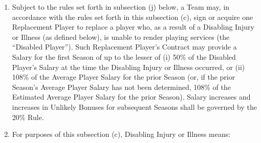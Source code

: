 \documentclass[
]{book}
\providecommand{\tightlist}{%
  \setlength{\itemsep}{0pt}\setlength{\parskip}{0pt}}
\begin{document}
\begin{enumerate}
  \begin{enumerate}
  \def\labelenumii{(\arabic{enumii})}
  \tightlist
  \item
    Subject to the rules set forth in subsection (j) below, a Team may, in accordance with the rules set forth in this subsection (c), sign or acquire one Replacement Player to replace a player who, as a result of a Disabling Injury or Illness (as defined below), is unable to render playing services (the ``Disabled Player''). Such Replacement Player's Contract may provide a Salary for the first Season of up to the lesser of (i) 50\% of the Disabled Player's Salary at the time the Disabling Injury or Illness occurred, or (ii) 108\% of the Average Player Salary for the prior Season (or, if the prior Season's Average Player Salary has not been determined, 108\% of the Estimated Average Player Salary for the prior Season). Salary increases and increases in Unlikely Bonuses for subsequent Seasons shall be governed by the 20\% Rule.
  \item
    For purposes of this subsection (c), Disabling Injury or Illness means:


\end{enumerate}
\end{enumerate}
\end{document}
